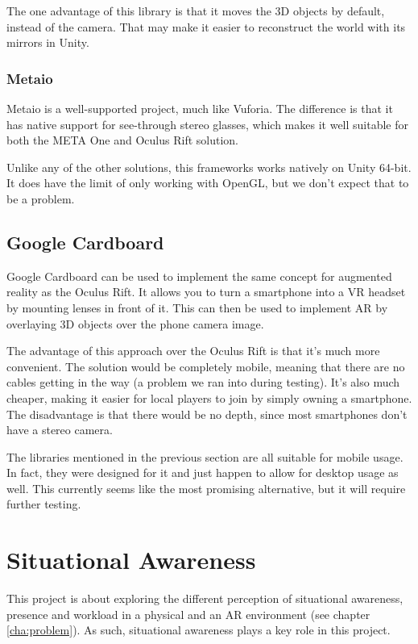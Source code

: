 				The one advantage of this library is that it moves the 3D
				objects by default, instead of the camera. That may make it
				easier to reconstruct the world with its mirrors in Unity.

			\subsubsection{Metaio} \label{sssec:metaio}
				Metaio is a well-supported project, much like Vuforia. The
				difference is that it has native support for see-through stereo
				glasses, which makes it well suitable for both the META One and
				Oculus Rift solution. \cite{metaio}

				Unlike any of the other solutions, this frameworks works
				natively on Unity 64-bit. It does have the limit of only working
				with OpenGL, but we don't expect that to be a problem.

		\subsection{Google Cardboard}

		Google Cardboard can be used to implement the same concept for augmented
		reality as the Oculus Rift. It allows you to turn a smartphone into a VR
		headset by mounting lenses in front of it. This can then be used to
		implement AR by overlaying 3D objects over the phone camera image.

		The advantage of this approach over the Oculus Rift is that it's much
		more convenient. The solution would be completely mobile, meaning that
		there are no cables getting in the way (a problem we ran into during
		testing). It's also much cheaper, making it easier for local players to
		join by simply owning a smartphone. The disadvantage is that there would
		be no depth, since most smartphones don't have a stereo camera.

		The libraries mentioned in the previous section are all suitable for
		mobile usage. In fact, they were designed for it and just happen to
		allow for desktop usage as well. This currently seems like the most
		promising alternative, but it will require further testing.

	\section{Situational Awareness} \label{sec:awareness}
		This project is about exploring the different perception of situational
		awareness, presence and workload in a physical and an AR environment
		(see chapter \ref{cha:problem}). As such, situational awareness plays a
		key role in this project.

